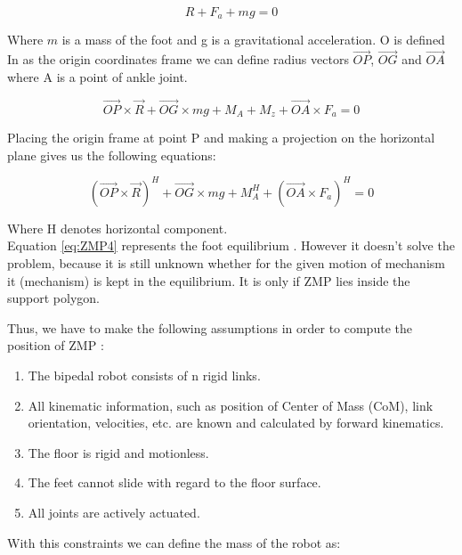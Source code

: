 \documentclass[12pt,a4paper]{report}
\begin{document}
		\begin{equation}\label{eq:ZMP2}
			R + F_a + mg = 0
		\end{equation}

		Where $m$ is a mass of the foot and g is a gravitational acceleration. O is defined In \cite{vukobratovic2004zero} as the origin coordinates frame we can define radius vectors $\vec{OP}$, $\vec{OG}$ and $\vec{OA}$ where A is a point of ankle joint.

		\begin{equation}\label{eq:ZMP3}
			\vec{OP} \times \vec{R} + \vec{OG} \times mg + M_A + M_z + \vec{OA} \times F_a = 0
		\end{equation}

		Placing the origin frame at point P and making a projection on the horizontal plane gives us the following equations: 

		\begin{equation}\label{eq:ZMP4}
			(\vec{OP} \times \vec{R})^H + \vec{OG} \times mg + M_A^H + (\vec{OA} \times F_a)^H = 0
		\end{equation}
		
		Where H denotes horizontal component.\\
		
		Equation \ref{eq:ZMP4} represents the foot equilibrium \cite{vukobratovic2004zero}. However it doesn't solve the problem, because it is still unknown whether for the given motion of mechanism it (mechanism) is kept in the equilibrium. It is only if ZMP lies inside the support polygon.
		
		Thus, we have to make the following assumptions in order to compute the position of ZMP \cite{dekker2009zero}:

		\begin{enumerate}
			\item
				The bipedal robot consists of n rigid links.
			\item
				All kinematic information, such as position of Center of Mass (CoM), link orientation, velocities, etc. are known and calculated by forward kinematics.
			\item
				The floor is rigid and motionless.
			\item
				The feet cannot slide with regard to the floor surface.
			\item
				All joints are actively actuated.
		\end{enumerate}
	
		With this constraints we can define the mass of the robot as:
	
\end{document}
